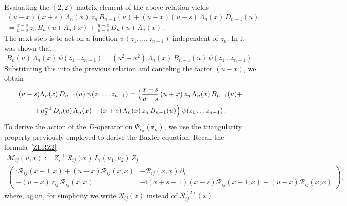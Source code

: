 \documentclass[a4paper,11pt]{article}
\renewcommand{\imath}{\mathrm{i}}
\numberwithin{equation}{section}
\begin{document}
Evaluating the $(2,2)$ matrix element of the above relation yields
\begin{multline*}
    (u-x)(x+s)\,\Lambda_n (x)\, z_n\, B_{n-1}(u) + (u-x)(u-s)\,\Lambda_n(x) \,D_{n-1}(u) \\ 
    = \frac{x-s}{u-s}\,z_n\,B_n(u)\,\Lambda_n(x) + \frac{u-x}{u-s}\,D_n(u)\,\Lambda_n(x) \,.
\end{multline*} 
The next step is to act on a function $\psi(z_1, \ldots, z_{n-1})$ independent of $z_n$. In \cite{ADV2} it was shown that
\begin{equation*}
    B_{n}(u)\,\Lambda_{n}\left(x\right)\,\psi(z_1\ldots z_{n-1}) =
    \left(u^2-x^2\right)\,\Lambda_{n}\left(x\right)\,B_{n-1}(u)\,
    \psi(z_1\ldots z_{n-1}) \,.
\end{equation*}
Substituting this into the previous relation and canceling the factor $(u-x)$, we obtain
\begin{multline}\label{1id}
    (u-s)\Lambda_n(x)\,D_{n-1}(u)\,\psi(z_1\ldots z_{n-1}) = \Bigl(\frac{x-s}{u-s}\,(u+x)\,z_n\,\Lambda_n(x)\,B_{n-1}(u) + \\ 
    + u_2^{-1}\,D_n(u)\,\Lambda_n(x) - (x+s)\,\Lambda_n(x)\,z_n\,B_{n-1}(u)\Bigr)\,\psi(z_1\ldots z_{n-1}) \,.
\end{multline}  
To derive the action of the $D$-operator on $\Psi_{\bm{x}_n}(\bm{z}_n)$, we use the triangularity property previously employed to derive the Baxter equation. Recall the formula~\eqref{ZLRZ2}
\begin{multline}\label{Rtr}
    \mathcal{M}_{ij}\left(u,x\right) := Z_i^{-1}\,
    \mathcal{R}_{ij}(x)\,L_i(u_1,u_2)\,Z_j = \\ 
    \begin{pmatrix}
        \imath\mathcal{R}_{ij}(x+1,\bar{x}) +
        (u-x)\mathcal{R}_{ij}(x,\bar{x}) & -\mathcal{R}_{ij}(x,\bar{x})\,\partial_{i} \\
        -(u-x)\,z_{ij}\,\mathcal{R}_{ij}(x,\bar{x}) & -\imath(x+s-1)(x-s)
        \mathcal{R}_{ij}(x-1,\bar{x})+(u-x)\mathcal{R}_{ij}(x,\bar{x})
    \end{pmatrix} ,
\end{multline}
where, again, for simplicity we write $\mathcal{R}_{ij}(x)$ instead of $\mathcal{R}^{(2)}_{ij}(x)$.
\end{document}
